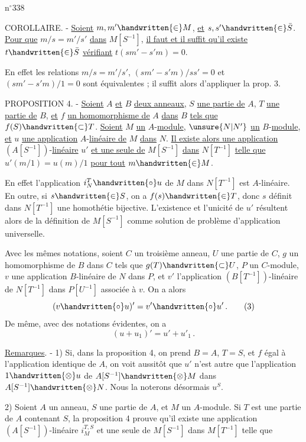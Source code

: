 \hfill n$^\circ$338

COROLLAIRE. - \uline{Soient} $m,m'\handwritten{\in}M$, \uline{et} $s,s'\handwritten{\in}\bar S$. \uline{Pour que} $m/s=m'/s'$ \uline{dans} $M[S^{-1}]$, \uline{il faut et il suffit qu'il existe} $t\handwritten{\in}\bar S$ \uline{vérifiant} $t(sm'-s'm)=0$.

En effet les relations $m/s=m'/s'$, $(sm'-s'm)/ss'=0$ et $(sm'-s'm)/1=0$ sont équivalentes ; il suffit alors d'appliquer la prop. 3.

PROPOSITION 4. - \uline{Soient} $A$ \uline{et} $B$ \uline{deux anneaux}, $S$ \uline{une partie de} $A$, $T$ \uline{une partie de} $B$, \uline{et} $f$ \uline{un homomorphisme de} $A$ \uline{dans} $B$ \uline{tels que} $f(S)\handwritten{\subset}T$. \uline{Soient} $M$ \uline{un} $A$-\uline{module}, $\unsure{N|N'}$ \uline{un} $B$-\uline{module}, \uline{et} $u$ \uline{une application} $A$-\uline{linéaire de} $M$ \uline{dans} $N$. \uline{Il existe alors une application} $(A[S^{-1}])$-\uline{linéaire} $u'$ \uline{et une seule de} $M[S^{-1}]$ \uline{dans} $N[T^{-1}]$ \uline{telle que} $u'(m/1)=u(m)/1$ \uline{pour tout} $m\handwritten{\in}M$.

En effet l'application $i_N^T\handwritten{\circ}u$ de $M$ dans $N[T^{-1}]$ est $A$-linéaire. En outre, si $s\handwritten{\in}S$, on a $f(s)\handwritten{\in}T$, donc $s$ définit dans $N[T^{-1}]$ une homothétie bijective. L'existence et l'unicité de $u'$ résultent alors de la définition de $M[S^{-1}]$ comme solution de problème d'application universelle.

Avec les mêmes notations, soient $C$ un troisième anneau, $U$ une partie de $C$, $g$ un homomorphisme de $B$ dans $C$ tels que $g(T)\handwritten{\subset}U$, $P$ un $C$-module, $v$ une application $B$-linéaire de $N$ dans $P$, et $v'$ l'application $(B[T^{-1}])$-linéaire de $N[T^{-1}]$ dans $P[U^{-1}]$ associée à $v$. On a alors
\[
(v\handwritten{\circ}u)'=v'\handwritten{\circ}u'\,.\tag*{(3)}
\]
De même, avec des notations évidentes, on a
\[
(u+u_1)'=u'+u'_1\,.\tag*{(4)}
\]

\uline{Remarques}. - 1) Si, dans la proposition 4, on prend $B=A$, $T=S$, et $f$ égal à l'application identique de $A$, on voit aussitôt que $u'$ n'est autre que l'application $1\handwritten{\otimes}u$ de $A[S^{-1}]\handwritten{\otimes}M$ dans $A[S^{-1}]\handwritten{\otimes}N$. Nous la noterons désormais $u^S$.

2) Soient $A$ un anneau, $S$ une partie de $A$, et $M$ un $A$-module. Si $T$ est une partie de $A$ contenant $S$, la proposition 4 prouve qu'il existe une application $(A[S^{-1}])$-linéaire $i_M^{T,S}$ et une seule de $M[S^{-1}]$ dans $M[T^{-1}]$ telle que


